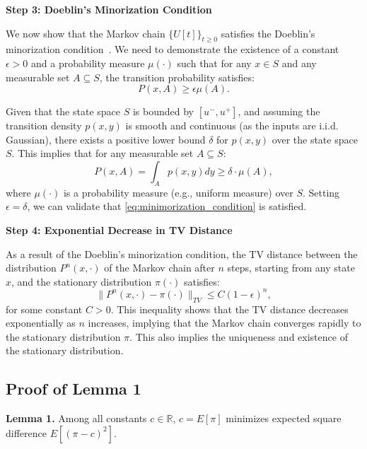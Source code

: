 \medskip
\noindent
\textbf{Step 3: Doeblin's Minorization Condition}

We now show that the Markov chain \( \{U[t]\}_{t \geq 0} \) satisfies the Doeblin's minorization condition~\cite{rosenthal:1995}. We need to demonstrate the existence of a constant \( \epsilon > 0 \) and a probability measure \( \mu(\cdot) \) such that for any \( x \in S \) and any measurable set \( A \subseteq S \), the transition probability satisfies:
\begin{equation}
\label{eq:minimorization_condition}
    P(x, A) \geq \epsilon \mu(A).
\end{equation}

Given that the state space \( S \) is bounded by \( [u^{-}, u^{+}] \), and assuming the transition density \( p(x, y) \) is smooth and continuous (as the inputs are i.i.d. Gaussian), there exists a positive lower bound \( \delta \) for \( p(x, y) \) over the state space \( S \). This implies that for any measurable set \( A \subseteq S \):
\begin{equation}
    P(x, A) = \int_A p(x, y) dy \geq \delta \cdot \mu(A),
\end{equation}
where \( \mu(\cdot) \) is a probability measure (e.g., uniform measure) over \( S \). Setting \( \epsilon = \delta \), we can validate that \cref{eq:minimorization_condition} is satisfied.

\medskip
\noindent
\textbf{Step 4: Exponential Decrease in TV Distance}

As a result of the Doeblin's minorization condition, the TV distance between the distribution \( P^n(x, \cdot) \) of the Markov chain after \( n \) steps, starting from any state \( x \), and the stationary distribution \( \pi(\cdot) \) satisfies:
\begin{equation}
\label{eq:convergence_speed}
    \| P^n(x, \cdot) - \pi(\cdot) \|_{TV} \leq C(1 - \epsilon)^n,
\end{equation}
for some constant \( C > 0 \). This inequality shows that the TV distance decreases exponentially as \( n \) increases, implying that the Markov chain converges rapidly to the stationary distribution \( \pi \). This also implies the uniqueness and existence of the stationary distribution.

\subsection{Proof of Lemma 1}
\label{subsec:proof_of_lemma_1}
\textbf{Lemma 1.} Among all constants \( c \in \mathbb{R} \), \( c = E[\pi] \) minimizes expected square difference \(E[(\pi-c)^{2}]\).

